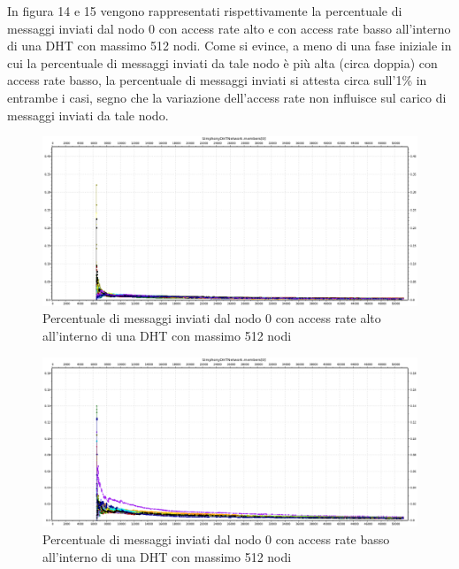 \documentclass[	
	DIV=calc,
	paper=a4,
	fontsize=11pt,
	onecolumn
]{scrartcl} %
\begin{document}
	In figura 14 e 15 vengono rappresentati rispettivamente la percentuale di messaggi inviati dal nodo 0 con access rate alto e con access rate basso all'interno di una DHT con massimo 512 nodi. Come si evince, a meno di una fase iniziale in cui la percentuale di messaggi inviati da tale nodo è più alta (circa doppia) con access rate basso, la percentuale di messaggi inviati si attesta circa sull'1\% in entrambe i casi, segno che la variazione dell'access rate non influisce sul carico di messaggi inviati da tale nodo.  
	
	\begin{figure}[H]
		\centering
		\includegraphics[scale=0.35]	{SymphonyDHT/plots/PercentageOfMessagesSent/512_Nodes_FastAccess/SymphonyDHT_512Nodes_FastAccess_Node0.png}
		\caption{Percentuale di messaggi inviati dal nodo 0 con access rate alto all'interno di una DHT con massimo 512 nodi}
		\label{Figura 14}
	\end{figure}
	\begin{figure}[H]
		\centering
		\includegraphics[scale=0.35]	{SymphonyDHT/plots/PercentageOfMessagesSent/512_Nodes_SlowAccess/SymphonyDHT_512Nodes_SlowAccess_Node0.png}
		\caption{Percentuale di messaggi inviati dal nodo 0 con access rate basso all'interno di una DHT con massimo 512 nodi}
		\label{Figura 15}
	\end{figure}	
	
\end{document}

